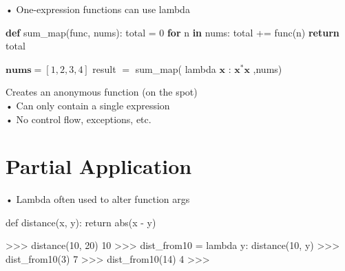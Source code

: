 \documentclass[
  letterpaper,
  DIV=11,
  numbers=noendperiod]{scrreprt}
\newenvironment{Shaded}{\begin{snugshade}}{\end{snugshade}}
\newcommand{\CharTok}[1]{\textcolor[rgb]{0.13,0.47,0.30}{#1}}
\newcommand{\ControlFlowTok}[1]{\textcolor[rgb]{0.00,0.23,0.31}{\textbf{#1}}}
\newcommand{\DecValTok}[1]{\textcolor[rgb]{0.68,0.00,0.00}{#1}}
\newcommand{\FunctionTok}[1]{\textcolor[rgb]{0.28,0.35,0.67}{#1}}
\newcommand{\KeywordTok}[1]{\textcolor[rgb]{0.00,0.23,0.31}{\textbf{#1}}}
\newcommand{\NormalTok}[1]{\textcolor[rgb]{0.00,0.23,0.31}{#1}}
\newcommand{\OperatorTok}[1]{\textcolor[rgb]{0.37,0.37,0.37}{#1}}
\begin{document}
• One-expression functions can use lambda

\begin{Shaded}
\begin{Highlighting}[]
\KeywordTok{def}\NormalTok{ sum\_map(func, nums): total }\OperatorTok{=} \DecValTok{0} \ControlFlowTok{for}\NormalTok{ n }\KeywordTok{in}\NormalTok{ nums: total }\OperatorTok{+=}\NormalTok{ func(n) }\ControlFlowTok{return}\NormalTok{ total }
\end{Highlighting}
\end{Shaded}

\(\mathbf{nums} = [1,2,3,4]\) result \(=\) sum\_map( lambda
\(\mathbf{x}\) : \(\mathbf{x}^{*}\mathbf{x}\) ,nums)

Creates an anonymous function (on the spot)\\
• Can only contain a single expression\\
• No control flow, exceptions, etc.


\chapter{Partial Application}\label{partial-application}

• Lambda often used to alter function args

\begin{Shaded}
\begin{Highlighting}[]
\NormalTok{def distance(x, y): return abs(x {-} y) }
\end{Highlighting}
\end{Shaded}

\begin{Shaded}
\begin{Highlighting}[]
\OperatorTok{\textgreater{}\textgreater{}\textgreater{}} \FunctionTok{distance(}\DecValTok{10}\FunctionTok{,} \DecValTok{20}\FunctionTok{)}  
\DecValTok{10}  
\OperatorTok{\textgreater{}\textgreater{}\textgreater{}} \CharTok{dist\_from10} \OperatorTok{=} \CharTok{lambda} \CharTok{y}\FunctionTok{:} \FunctionTok{distance(}\DecValTok{10}\FunctionTok{,} \CharTok{y}\FunctionTok{)}  
\OperatorTok{\textgreater{}\textgreater{}\textgreater{}} \FunctionTok{dist\_from10(}\DecValTok{3}\FunctionTok{)}  
\DecValTok{7}  
\OperatorTok{\textgreater{}\textgreater{}\textgreater{}} \FunctionTok{dist\_from10(}\DecValTok{14}\FunctionTok{)}  
\DecValTok{4}  
\OperatorTok{\textgreater{}\textgreater{}\textgreater{}} 
\end{Highlighting}
\end{Shaded}
\end{document}
